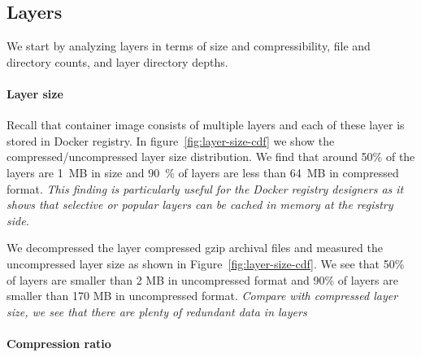\subsection{Layers}
\label{sec:layers}

We start by analyzing layers in terms of size and compressibility, file and
directory counts, and layer directory depths.

\paragraph{Layer size}



Recall that container image consists of multiple layers and each of these layer
is stored in Docker registry.
%
In figure~\ref{fig:layer-size-cdf} we show the compressed/uncompressed layer
size distribution.
%
We find that around 50\% of the layers are 1~MB in size and 90~\% of layers are
less than 64~MB in compressed format.
%
\emph{This finding is particularly useful for the Docker registry designers as
it shows that selective or popular layers can be cached in memory at the
registry side.}

%


We decompressed the layer compressed gzip archival files and measured the
uncompressed layer size as shown in Figure~\ref{fig:layer-size-cdf}.
%
We see that 50\% of layers are smaller than 2 MB in uncompressed format and
90\% of layers are smaller than 170 MB in uncompressed format.
%
\emph{Compare with compressed layer size, we see that there are plenty of
redundant data in layers}



\paragraph{Compression ratio}

